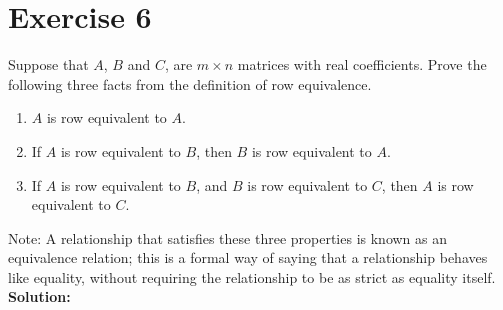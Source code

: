 \documentclass{article}
\begin{document}
\section*{Exercise 6}
Suppose that $A$, $B$ and $C$, are $m \times n$ matrices with real coefficients. Prove the following three facts from the definition of row equivalence.
\begin{enumerate}[label=(\alph*)]
\item $A$ is row equivalent to $A$.
\item If $A$ is row equivalent to $B$, then $B$ is row equivalent to $A$.
\item If $A$ is row equivalent to $B$, and $B$ is row equivalent to $C$, then $A$ is row equivalent to $C$.
\end{enumerate}
Note: A relationship that satisfies these three properties is known as an equivalence relation; this is a formal way of saying that a relationship behaves like equality, without requiring the relationship to be as strict as equality itself. \\

\textbf{Solution:}
\end{document}

